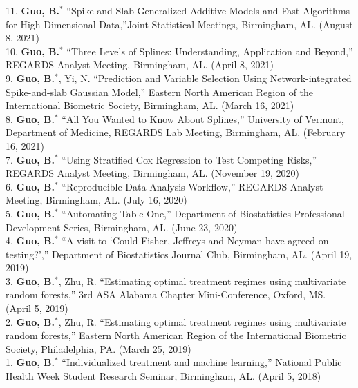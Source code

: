 \documentclass[10pt]{article}
\begin{document}
11. \textbf{Guo, B.}$^\ast$  ``Spike-and-Slab Generalized Additive Models and Fast Algorithms for High-Dimensional Data,''Joint Statistical Meetings, Birmingham, AL. (August 8, 2021)\\

10. \textbf{Guo, B.}$^\ast$  ``Three Levels of Splines: Understanding, Application and Beyond,'' REGARDS Analyst Meeting, Birmingham, AL. (April 8, 2021)\\

9. \textbf{Guo, B.}$^\ast$, Yi, N. ``Prediction and Variable Selection Using Network-integrated Spike-and-slab Gaussian Model,'' Eastern North American Region of the International Biometric Society, Birmingham, AL. (March 16, 2021)\\

8. \textbf{Guo, B.}$^\ast$  ``All You Wanted to Know About Splines,'' University of Vermont, Department of Medicine, REGARDS Lab Meeting, Birmingham, AL. (February 16, 2021)\\

7. \textbf{Guo, B.}$^\ast$  ``Using Stratified Cox Regression to Test Competing Risks,'' REGARDS Analyst Meeting, Birmingham, AL. (November 19, 2020)\\

6. \textbf{Guo, B.}$^\ast$  ``Reproducible Data Analysis Workflow,'' REGARDS Analyst Meeting, Birmingham, AL. (July 16, 2020)\\

5. \textbf{Guo, B.}$^\ast$  ``Automating Table One,'' Department of Biostatistics Professional Development Series, Birmingham, AL. (June 23, 2020)\\

4. \textbf{Guo, B.}$^\ast$  ``A visit to `Could Fisher, Jeffreys and Neyman have agreed on testing?','' Department of Biostatistics Journal Club, Birmingham, AL. (April 19, 2019)\\

3. \textbf{Guo, B.}$^\ast$,  Zhu, R. ``Estimating optimal treatment regimes using multivariate random forests,'' 3rd ASA Alabama Chapter Mini-Conference, Oxford, MS. (April 5, 2019)\\

2. \textbf{Guo, B.}$^\ast$,  Zhu, R. ``Estimating optimal treatment regimes using multivariate random forests,'' Eastern North American Region of the International Biometric Society, Philadelphia, PA. (March 25, 2019)\\

1. \textbf{Guo, B.}$^\ast$  ``Individualized treatment and machine learning,'' National Public Health Week Student Research Seminar, Birmingham, AL. (April 5, 2018)\\
\end{document}
